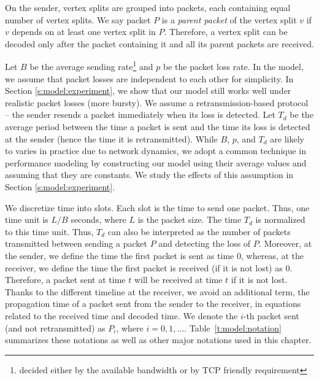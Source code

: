     On the sender, vertex splits are grouped into packets,
    each containing equal number of vertex splits.  We say packet $P$ is a \textit{parent packet}
    of the vertex split $v$ if %
    $v$ 
    depends on at least one vertex split in $P$.  Therefore, a vertex split
    can be decoded only after the packet containing it and all its
    parent packets are received.


    Let $B$ be the average
    sending rate\footnote{decided either by the available bandwidth or by TCP friendly requirement} and $p$ be the packet loss rate.
    In the model, we assume that packet losses are independent to each other for simplicity.
    In Section \ref{s:model:experiment}, we %
    show that our model still works well under realistic packet losses (more bursty).
    We assume a retransmission-based protocol -- the sender resends a packet 
    immediately when its loss is detected.
    Let $T_d$ be the
    average period between the time a packet %
    is sent and the
    time %
    its loss is detected at the sender (hence the time it is retransmitted).
    While $B$, $p$, and $T_d$ are likely to varies in practice due to network dynamics, 
    we adopt a common technique in performance modeling by constructing our model using 
    their average values and assuming that they are constants.
    We study the effects of this assumption in Section \ref{s:model:experiment}.

    We discretize time into slots.  Each slot is the time to
    send one packet.  Thus, one time unit is $L/B$ seconds, where $L$ is the
    packet size.  
    The time $T_d$ is normalized to this
    time unit.  Thus, $T_d$ can also be interpreted as the number
    of packets transmitted between sending a packet $P$ and detecting
    the loss of $P$.  Moreover, at the sender,
    we define the time the first packet is sent as time $0$, whereas, at
    the receiver, we define the time the first packet is received (if it
    is not lost) as $0$.  Therefore, a packet sent at time $t$ will be 
    received at time $t$ if it is not lost.  Thanks to the different 
    timeline at the
    receiver, we avoid an additional term, the propagation time of a packet
    sent from the sender to the receiver, in
    equations related to the received time and decoded time. 
    We denote the $i$-th packet sent (and not retransmitted) as $P_i$, where $i = 0, 1, ...$.
    Table~\ref{t:model:notation} summarizes these notations as well as
    other major notations used in this chapter.

